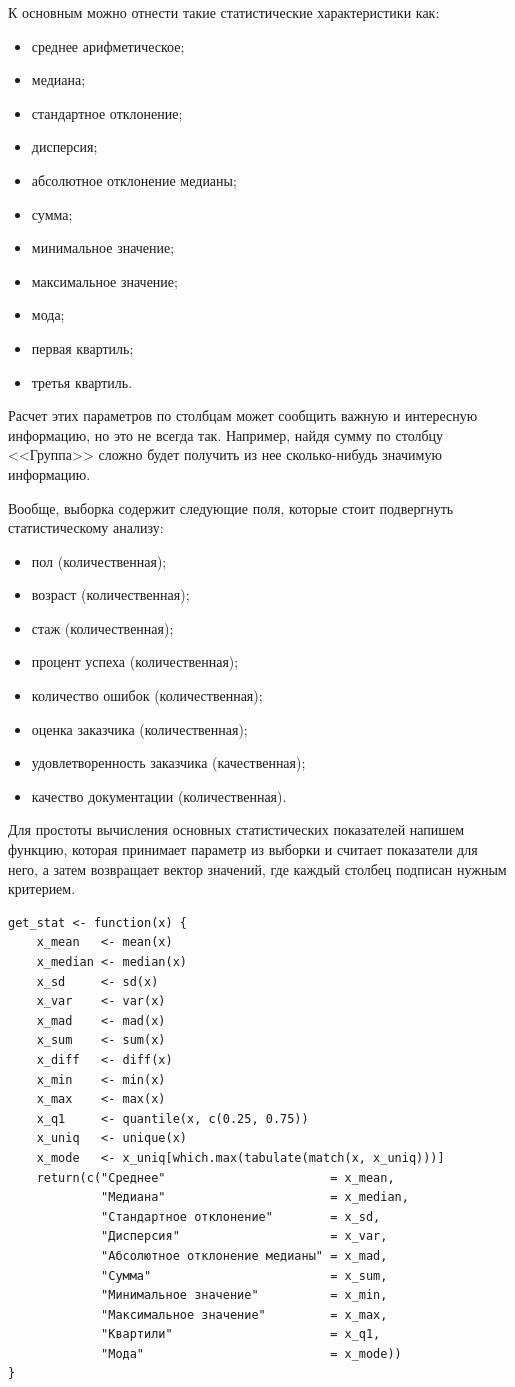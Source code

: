 К основным можно отнести такие статистические характеристики как:
\begin{itemize}
	\item среднее арифметическое;
	\item медиана;
	\item стандартное отклонение;
	\item дисперсия;
	\item абсолютное отклонение медианы;
	\item сумма;
	\item минимальное значение;
	\item максимальное значение;
	\item мода;
	\item первая квартиль;
	\item третья квартиль.
\end{itemize}

Расчет этих параметров по столбцам может сообщить важную и интересную информацию, но это не всегда так. Например, найдя сумму по столбцу <<Группа>> сложно будет получить из нее сколько-нибудь значимую информацию.

Вообще, выборка содержит следующие поля, которые стоит подвергнуть статистическому анализу:

\begin{itemize}
	\item пол (количественная);
	\item возраст (количественная);
	\item стаж (количественная);
	\item процент успеха (количественная);
	\item количество ошибок (количественная);
	\item оценка заказчика (количественная);
	\item удовлетворенность заказчика (качественная);
	\item качество документации (количественная).
\end{itemize}

Для простоты вычисления основных статистических показателей напишем функцию, которая принимает параметр из выборки и считает показатели для него, а затем возвращает вектор значений, где каждый столбец подписан нужным критерием.

\begin{verbatim}
get_stat <- function(x) {
	x_mean   <- mean(x)
	x_median <- median(x)
	x_sd     <- sd(x)
	x_var    <- var(x)
	x_mad    <- mad(x)
	x_sum    <- sum(x)
	x_diff   <- diff(x)
	x_min    <- min(x)
	x_max    <- max(x)
	x_q1     <- quantile(x, c(0.25, 0.75))
	x_uniq   <- unique(x)
	x_mode   <- x_uniq[which.max(tabulate(match(x, x_uniq)))]
	return(c("Среднее"                       = x_mean,
	         "Медиана"                       = x_median,
	         "Стандартное отклонение"        = x_sd,
	         "Дисперсия"                     = x_var,
	         "Абсолютное отклонение медианы" = x_mad,
	         "Сумма"                         = x_sum,
	         "Минимальное значение"          = x_min,
	         "Максимальное значение"         = x_max,
	         "Квартили"                      = x_q1,
	         "Мода"                          = x_mode))
}
\end{verbatim}

